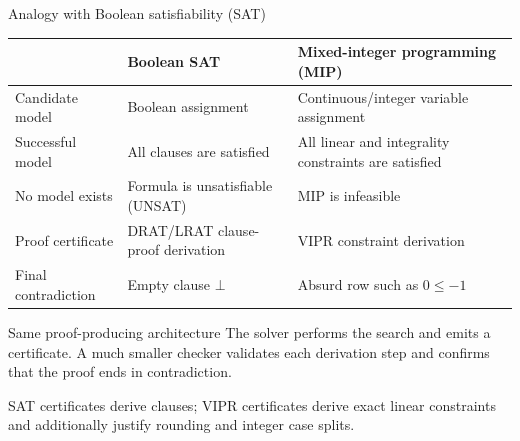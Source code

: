 \documentclass[aspectratio=169,11pt]{beamer}
\newcommand{\vipr}{\textsc{VIPR}}
\begin{document}
\begin{frame}{Analogy with Boolean satisfiability (SAT)}
  \footnotesize
  \begin{tabular}{@{}p{}p{}p{}@{}}
    \toprule
    & Boolean SAT & Mixed-integer programming (MIP) \\
    \midrule
    Candidate model &
      Boolean assignment &
      Continuous/integer variable assignment \\[0.5em]
    Successful model &
      All clauses are satisfied &
      All linear and integrality constraints are satisfied \\[0.5em]
    No model exists &
      Formula is \alert{unsatisfiable (UNSAT)} &
      MIP is \alert{infeasible} \\[0.5em]
    Proof certificate &
      DRAT/LRAT clause-proof derivation &
      \vipr{} constraint derivation \\[0.5em]
    Final contradiction &
      Empty clause $\bot$ &
      Absurd row such as $0\leq -1$ \\
    \bottomrule
  \end{tabular}

  \vspace{0.8em}
  \begin{block}{Same proof-producing architecture}
    The solver performs the search and emits a certificate. A much smaller checker
    validates each derivation step and confirms that the proof ends in contradiction.
  \end{block}

  \vspace{0.3em}
  SAT certificates derive clauses; \vipr{} certificates derive exact linear
  constraints and additionally justify rounding and integer case splits.
\end{frame}
\end{document}
